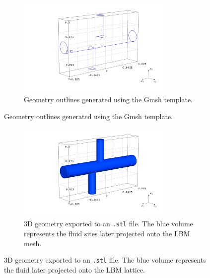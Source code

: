 \begin{figure}[H]
	\begin{subfigure}{0.99\textwidth}
		\centering
		\includegraphics[width=0.83\textwidth, trim={70mm 25mm 10mm 10mm}, clip]{figures/outline.png}
		\caption{Geometry outlines generated using the Gmsh template.}
		\label{fig:outline}
	\end{subfigure}
\end{figure}
\begin{figure}[H]\ContinuedFloat
	\begin{subfigure}{0.99\textwidth}
		\vspace{-10mm}
		\centering
		\includegraphics[width=0.83\textwidth, trim={70mm 25mm 10mm 10mm}, clip]{figures/stl.png}
		\caption{3D geometry exported to an \texttt{.stl} file. The blue volume represents the fluid sites later projected onto the LBM mesh.}
		\label{fig:stl file}
	\end{subfigure}
	\caption{3D geometry exported to an \texttt{.stl} file. The blue volume represents the fluid later projected onto the LBM lattice.}
\end{figure}
